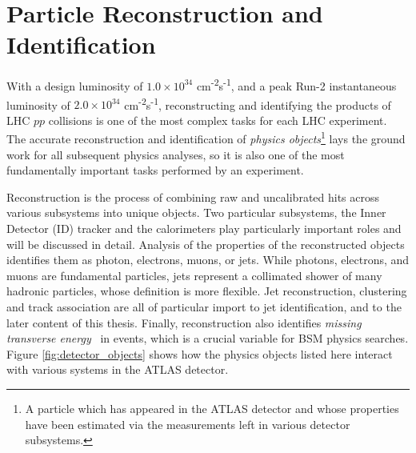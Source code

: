 \chapter{Particle Reconstruction and Identification}
\label{ch:part_reco}

With a design luminosity of $1.0 \times 10^{34}$ cm\textsuperscript{-2}s\textsuperscript{-1}, and a peak Run-2 instantaneous luminosity of $2.0 \times 10^{34}$ cm\textsuperscript{-2}s\textsuperscript{-1}, reconstructing and identifying the products of LHC $pp$ collisions is one of the most complex tasks for each LHC experiment. The accurate reconstruction and identification of \textit{physics objects}\footnote{A particle which has appeared in the ATLAS detector and whose properties have been estimated via the measurements left in various detector subsystems.} lays the ground work for all subsequent physics analyses, so it is also one of the most fundamentally important tasks performed by an experiment. \par

Reconstruction is the process of combining raw and uncalibrated hits across various subsystems into unique objects. Two particular subsystems, the Inner Detector (ID) tracker and the calorimeters play particularly important roles and will be discussed in detail. Analysis of the properties of the reconstructed objects identifies them as photon, electrons, muons, or jets. While photons, electrons, and muons are fundamental particles, jets represent a collimated shower of many hadronic particles, whose definition is more flexible. Jet reconstruction, clustering and track association are all of particular import to jet identification, and to the later content of this thesis. Finally, reconstruction also identifies \textit{missing transverse energy} \met~in events, which is a crucial variable for BSM physics searches. Figure \ref{fig:detector_objects} shows how the physics objects listed here interact with various systems in the ATLAS detector. 

